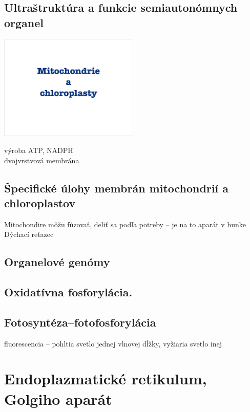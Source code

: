 \subsection{Ultraštruktúra a funkcie semiautonómnych organel}

\includegraphics[width=0.5\textwidth, page=5]{materials/Bunkova_biologia/prednasky_zaklady_bunkovej_biologie/08_ZBB08-Mitochondrieachloroplasty.pdf}

výroba ATP, NADPH\\
dvojvrstvová membrána\\
\subsection{Špecifické úlohy membrán mitochondrií a chloroplastov}
Mitochondire môžu fúzovať, deliť sa podľa potreby -- je na to aparát v bunke\\
Dýchací reťazec\\

\subsection{Organelové genómy}

\subsection{Oxidatívna fosforylácia.}

\subsection{Fotosyntéza--fotofosforylácia}
fluorescencia -- pohltia svetlo jednej vlnovej dĺžky, vyžiaria svetlo inej\\

\section{Endoplazmatické retikulum, Golgiho aparát}

